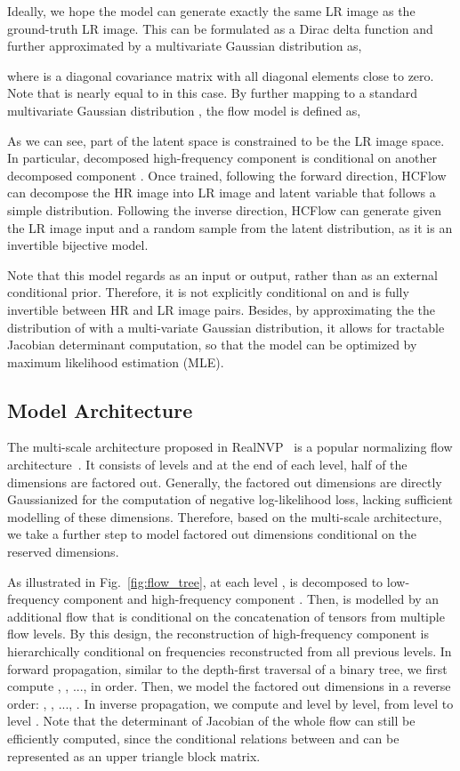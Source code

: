 \documentclass[10pt,twocolumn,letterpaper]{article}
\begin{document}
Ideally, we hope the model can generate exactly the same LR image as the ground-truth LR image. This can be formulated as a Dirac delta function  and further approximated by a multivariate Gaussian distribution as,

where  is a diagonal covariance matrix with all diagonal elements close to zero. Note that  is nearly equal to  in this case. By further mapping  to a standard multivariate Gaussian distribution , the flow model is defined as,
 

As we can see, part of the latent space is constrained to be the LR image space. In particular, decomposed high-frequency component  is conditional on another decomposed component . Once trained, following the forward direction, HCFlow can decompose the HR image  into LR image  and latent variable  that follows a simple distribution. Following the inverse direction, HCFlow can generate  given the LR image input  and a random sample  from the latent distribution, as it is an invertible bijective model.

Note that this model regards  as an input or output, rather than as an external conditional prior. Therefore, it is not explicitly conditional on  and is fully invertible between HR and LR image pairs. Besides, by approximating the the distribution of  with a multi-variate Gaussian distribution, it allows for tractable Jacobian determinant computation, so that the model can be optimized by maximum likelihood estimation (MLE).


\subsection{Model Architecture}
The multi-scale architecture proposed in RealNVP~\cite{dinh2016realnvp} is a popular normalizing flow architecture~\cite{lugmayr2020srflow, kingma2018glow, ho2019flow++}. It consists of  levels and at the end of each level, half of the dimensions are factored out. Generally, the factored out dimensions are directly Gaussianized for the computation of negative log-likelihood loss, lacking sufficient modelling of these dimensions. Therefore, based on the multi-scale architecture, we take a further step to model factored out dimensions conditional on the reserved dimensions.

As illustrated in Fig.~\ref{fig:flow_tree}, at each level ,  is decomposed to low-frequency component  and high-frequency component . Then,  is modelled by an additional flow that is conditional on the concatenation of tensors  from multiple flow levels. By this design, the reconstruction of high-frequency component is hierarchically conditional on frequencies reconstructed from all previous levels. In forward propagation, similar to the depth-first traversal of a binary tree, we first compute , , ...,  in order. Then, we model the factored out dimensions in a reverse order: , , ..., . In inverse propagation, we compute  and  level by level, from level  to level . Note that the determinant of Jacobian of the whole flow can still be efficiently computed, since the conditional relations between  and  can be represented as an upper triangle block matrix.
\end{document}
